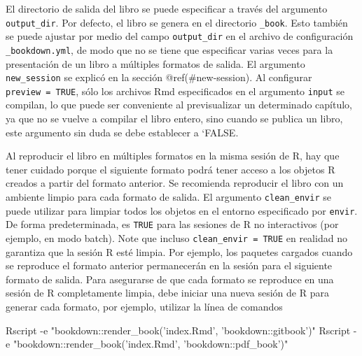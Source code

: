 \documentclass[12pt,]{krantz}
\makeatletter
\newenvironment{Shaded}{\begin{snugshade}}{\end{snugshade}}
\newcommand{\StringTok}[1]{\textcolor[rgb]{0.31,0.60,0.02}{#1}}
\newcommand{\ExtensionTok}[1]{#1}
\newcommand{\NormalTok}[1]{#1}
\newenvironment{kframe}{%
\medskip{}
\setlength{\fboxsep}{.8em}
 \def\at@end@of@kframe{}%
 \ifinner\ifhmode%
  \def\at@end@of@kframe{\end{minipage}}%
  \begin{minipage}{\columnwidth}%
 \fi\fi%
 \def\FrameCommand##1{\hskip\@totalleftmargin \hskip-\fboxsep
 \colorbox{shadecolor}{##1}\hskip-\fboxsep
     \hskip-\linewidth \hskip-\@totalleftmargin \hskip\columnwidth}%
 \MakeFramed {\advance\hsize-\width
   \@totalleftmargin\z@ \linewidth\hsize
   \@setminipage}}%
 {\par\unskip\endMakeFramed%
 \at@end@of@kframe}
\renewenvironment{Shaded}{\begin{kframe}}{\end{kframe}}
\theoremstyle{definition}
\theoremstyle{definition}
\theoremstyle{definition}
\theoremstyle{remark}
\makeatother
\begin{document}
El directorio de salida del libro se puede especificar a través del
argumento \texttt{output\_dir}. Por defecto, el libro se genera en el
directorio \texttt{\_book}. Esto también se puede ajustar por medio del
campo \texttt{output\_dir} en el archivo de configuración
\texttt{\_bookdown.yml}, de modo que no se tiene que especificar varias
veces para la presentación de un libro a múltiples formatos de salida.
El argumento \texttt{new\_session} se explicó en la sección
@ref(\#new-session). Al configurar \texttt{preview\ =\ TRUE}, sólo los
archivos Rmd especificados en el argumento \texttt{input} se compilan,
lo que puede ser conveniente al previsualizar un determinado capítulo,
ya que no se vuelve a compilar el libro entero, sino cuando se publica
un libro, este argumento sin duda se debe establecer a `FALSE.

Al reproducir el libro en múltiples formatos en la misma sesión de R,
hay que tener cuidado porque el siguiente formato podrá tener acceso a
los objetos R creados a partir del formato anterior. Se recomienda
reproducir el libro con un ambiente limpio para cada formato de salida.
El argumento \texttt{clean\_envir} se puede utilizar para limpiar todos
los objetos en el entorno especificado por \texttt{envir}. De forma
predeterminada, es \texttt{TRUE} para las sesiones de R no interactivos
(por ejemplo, en modo batch). Note que incluso
\texttt{clean\_envir\ =\ TRUE} en realidad no garantiza que la sesión R
esté limpia. Por ejemplo, los paquetes cargados cuando se reproduce el
formato anterior permanecerán en la sesión para el siguiente formato de
salida. Para asegurarse de que cada formato se reproduce en una sesión
de R completamente limpia, debe iniciar una nueva sesión de R para
generar cada formato, por ejemplo, utilizar la línea de comandos

\begin{Shaded}
\begin{Highlighting}[]
\ExtensionTok{Rscript}\NormalTok{ -e }\StringTok{"bookdown::render_book('index.Rmd', 'bookdown::gitbook')"}
\ExtensionTok{Rscript}\NormalTok{ -e }\StringTok{"bookdown::render_book('index.Rmd', 'bookdown::pdf_book')"}
\end{Highlighting}
\end{Shaded}
\end{document}
